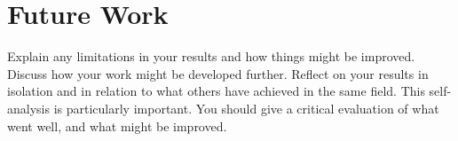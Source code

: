 \documentclass[a4paper,11pt]{report}
\begin{document}
\section{Future Work}

\label{conclusion-future}

Explain any limitations in your results and how things might be improved.
Discuss how your work might be developed further. Reflect on your results in
isolation and in relation to what others have achieved in the same field. This
self-analysis is particularly important. You should give a critical evaluation
of what went well, and what might be improved.







\appendix
\end{document}
